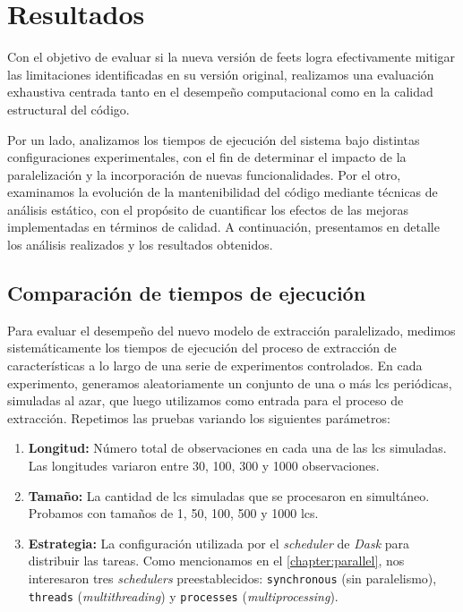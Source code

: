 \chapter{Resultados}
\label{chapter:resultados}

Con el objetivo de evaluar si la nueva versión de \gls{feets} logra efectivamente mitigar las limitaciones identificadas en su versión original, realizamos una evaluación exhaustiva centrada tanto en el desempeño computacional como en la calidad estructural del código.

Por un lado, analizamos los tiempos de ejecución del sistema bajo distintas configuraciones experimentales, con el fin de determinar el impacto de la paralelización y la incorporación de nuevas funcionalidades. Por el otro, examinamos la evolución de la mantenibilidad del código mediante técnicas de análisis estático, con el propósito de cuantificar los efectos de las mejoras implementadas en términos de calidad. A continuación, presentamos en detalle los análisis realizados y los resultados obtenidos.

\section{Comparación de tiempos de ejecución}

Para evaluar el desempeño del nuevo modelo de extracción paralelizado, medimos sistemáticamente los tiempos de ejecución del proceso de extracción de características a lo largo de una serie de experimentos controlados. En cada experimento, generamos aleatoriamente un conjunto de una o más \glspl{lc} periódicas, simuladas al azar, que luego utilizamos como entrada para el proceso de extracción. Repetimos las pruebas variando los siguientes parámetros:

\begin{enumerate}
    \item \textbf{Longitud:} Número total de observaciones en cada una de las \glspl{lc} simuladas. Las longitudes variaron entre 30, 100, 300 y 1000 observaciones.
    
    \item \textbf{Tamaño:} La cantidad de \glspl{lc} simuladas que se procesaron en simultáneo. Probamos con tamaños de 1, 50, 100, 500 y 1000 \glspl{lc}.

    \item \textbf{Estrategia:} La configuración utilizada por el \emph{scheduler} de \emph{Dask} para distribuir las tareas. Como mencionamos en el \autoref{chapter:parallel}, nos interesaron tres \emph{schedulers} preestablecidos: \texttt{synchronous} (sin paralelismo), \texttt{threads} (\emph{multithreading}) y \texttt{processes} (\emph{multiprocessing}). 
\end{enumerate}

